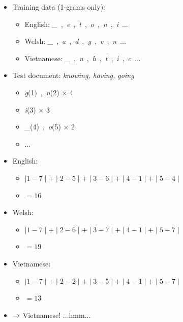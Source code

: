 \documentclass[a4paper,landscape,headrule,footrule,xetex]{foils}
\begin{document}
\begin{itemize}
\item Training data (1-grams only):
\begin{itemize}
\item English: \textit{\_}~,~\textit{e}~,~\textit{t}~,~\textit{o}~,~\textit{n}~,~\textit{i}~...
\item Welsh: \textit{\_}~,~\textit{a}~,~\textit{d}~,~\textit{y}~,~\textit{e}~,~\textit{n}~...
\item Vietnamese: \textit{\_}~,~\textit{n}~,~\textit{h}~,~\textit{t}~,~\textit{i}~,~\textit{c}~...
\end{itemize}
\item Test document: \textit{knowing, having, going}
\begin{itemize}
\item \textit{g}(1)~,~\textit{n}(2) $\times$ 4
\item \textit{i}(3) $\times$ 3
\item \textit{\_}(4)~,~\textit{o}(5) $\times$ 2
\item ...
\end{itemize}

\newpage



\item English:
\begin{itemize}
\item $\mid 1-7\mid + \mid 2-5\mid + \mid 3-6\mid + \mid 4-1\mid + \mid 5-4\mid$
\item $=16$
\end{itemize}
\item Welsh:
\begin{itemize}
\item $\mid 1-7\mid + \mid 2-6\mid + \mid 3-7\mid + \mid 4-1\mid + \mid 5-7\mid$
\item $=19$
\end{itemize}
\item Vietnamese:
\begin{itemize}
\item $\mid 1-7\mid + \mid 2-2\mid + \mid 3-5\mid + \mid 4-1\mid + \mid 5-7\mid$
\item $=13$
\end{itemize}
\item $\rightarrow$ Vietnamese! ...hmm...
\end{itemize}





\MyLogo
\end{document}
